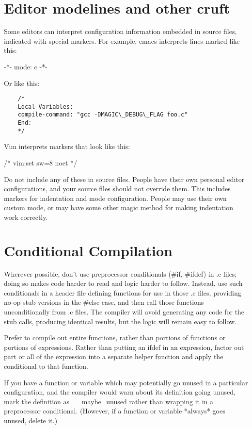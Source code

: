 \documentclass[pdftex,12pt, twocol]{article} %
\begin{document}
\section{Editor modelines and other cruft}

Some editors can interpret configuration information embedded in source files,
indicated with special markers.  For example, emacs interprets lines marked
like this:

	-*- mode: c -*-

Or like this:

\begin{verbatim}
	/*
	Local Variables:
	compile-command: "gcc -DMAGIC\_DEBUG\_FLAG foo.c"
	End:
	*/
\end{verbatim}

Vim interprets markers that look like this:

	/* vim:set sw=8 noet */

Do not include any of these in source files.  People have their own personal
editor configurations, and your source files should not override them.  This
includes markers for indentation and mode configuration.  People may use their
own custom mode, or may have some other magic method for making indentation
work correctly.

\section{Conditional Compilation}

Wherever possible, don't use preprocessor conditionals (\#if, \#ifdef) in .c
files; doing so makes code harder to read and logic harder to follow.  Instead,
use such conditionals in a header file defining functions for use in those .c
files, providing no-op stub versions in the \#else case, and then call those
functions unconditionally from .c files.  The compiler will avoid generating
any code for the stub calls, producing identical results, but the logic will
remain easy to follow.

Prefer to compile out entire functions, rather than portions of functions or
portions of expressions.  Rather than putting an ifdef in an expression, factor
out part or all of the expression into a separate helper function and apply the
conditional to that function.

If you have a function or variable which may potentially go unused in a
particular configuration, and the compiler would warn about its definition
going unused, mark the definition as \_\_maybe\_unused rather than wrapping it in
a preprocessor conditional.  (However, if a function or variable *always* goes
unused, delete it.)
\end{document}
